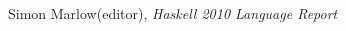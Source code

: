 \documentclass[fontsize=14pt, paper=a4, pagesize, DIV=calc]{scrartcl}
\begin{document}
\tableofcontents

\clearpage



\clearpage







\clearpage

\begin{thebibliography}{9}

Simon Marlow(editor),
\emph{Haskell 2010 Language Report}

\end{thebibliography}
\end{document}
